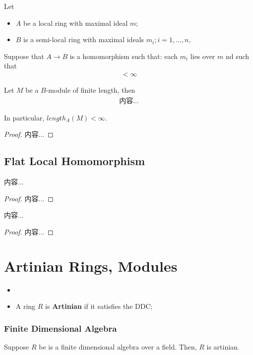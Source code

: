 \documentclass[Total.tex]{subfiles}
\begin{document}
		\begin{lemma}
			Let
			\begin{itemize}
				\item  $A$ be a local ring with maximal ideal $m$;
				\item $B$ is a semi-local ring with maximal ideals $m_i;i=1,\dots,n$, 
			\end{itemize}
			
			Suppose that $A\rightarrow B$ is a homomorphism such that: each $m_i$ lies over $m$ nd such that
			\begin{gather*}
				[\kappa(m_i):\kappa(m)]<\infty
			\end{gather*}
			
			Let $M$ be a $B$-module of finite length, then
			\begin{gather*}
				内容...
			\end{gather*}
			
			In particular, $length_A(M)<\infty$.
		\end{lemma}
		\begin{proof}
			内容...
		\end{proof}
		
		\subsection{Flat Local Homomorphism}
		
		\begin{lemma}
			内容...
		\end{lemma}
		\begin{proof}
			内容...
		\end{proof}
		
		\begin{lemma}
			内容...
		\end{lemma}
		\begin{proof}
			内容...
		\end{proof}
		\section{Artinian Rings, Modules}
		
		\begin{Def}
			\begin{itemize}
				\item 
				\item A ring $R$ is \textbf{Artinian} if it satisfies the DDC;
			\end{itemize}
		\end{Def}
		\subsubsection{Finite Dimensional Algebra}
		\begin{lemma}
			Suppose $R$ be is a finite dimensional algebra over a field. Then, $R$ is artinian. 
		\end{lemma}
		
\end{document}
